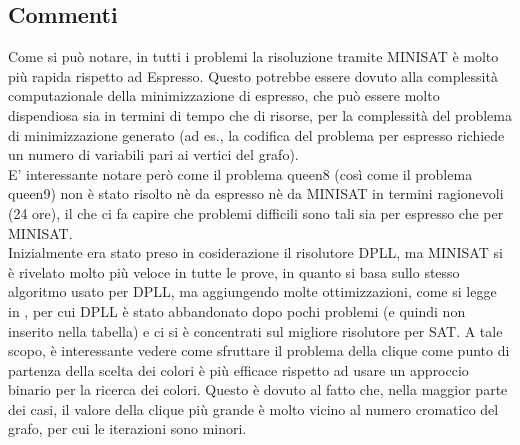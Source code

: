 \documentclass[a4paper,11pt]{article} %
\begin{document}
\subsection{Commenti}
Come si può notare, in tutti i problemi la risoluzione tramite MINISAT è molto più rapida rispetto ad Espresso. Questo potrebbe essere dovuto alla complessità computazionale della minimizzazione di espresso, che può essere molto dispendiosa sia in termini di tempo che di risorse, per la complessità del problema di minimizzazione generato (ad es., la codifica del problema per espresso richiede un numero di variabili pari ai vertici del grafo).\\
E' interessante notare però come il problema queen8 (così come il problema queen9) non è stato risolto nè da espresso nè da MINISAT in termini ragionevoli (24 ore), il che ci fa capire che problemi difficili sono tali sia per espresso che per MINISAT.\\
Inizialmente era stato preso in cosiderazione il risolutore DPLL, ma MINISAT si è rivelato molto più veloce in tutte le prove, in quanto si basa sullo stesso algoritmo usato per DPLL, ma aggiungendo molte ottimizzazioni, come si legge in \cite{minisat}, per cui DPLL è stato abbandonato dopo pochi problemi (e quindi non inserito nella tabella) e ci si è concentrati sul migliore risolutore per SAT. A tale scopo, è interessante vedere come sfruttare il problema della clique come punto di partenza della scelta dei colori è più efficace rispetto ad usare un approccio binario per la ricerca dei colori. Questo è dovuto al fatto che, nella maggior parte dei casi, il valore della clique più grande è molto vicino al numero cromatico del grafo, per cui le iterazioni sono minori.

\pagebreak
\end{document}
